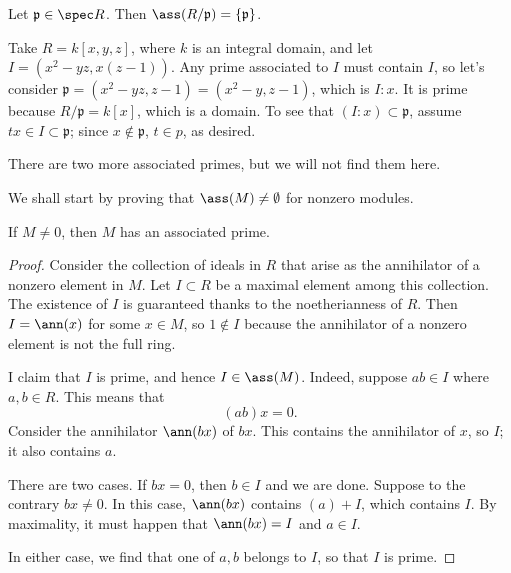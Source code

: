 \begin{exercise} 
Let $\mathfrak{p} \in \spec R$. Then $\ass(R/\mathfrak{p}) =
\left\{\mathfrak{p}\right\}$.
\end{exercise} 

\begin{example}
Take $R=k[x,y,z]$, where $k$ is an integral domain, and let $I = (x^2-yz,x(z-1))$. Any
 prime associated to $I$ must contain $I$, so let's consider
   $\mathfrak{p}=(x^2-yz,z-1)=(x^2-y,z-1)$, which is $I:x$. It is prime because $R/\mathfrak{p} = k[x]$,
   which is a domain. To see that $(I:x)\subset \mathfrak{p}$, assume $tx\in I\subset \mathfrak{p}$; since
   $x\not\in \mathfrak{p}$, $t\in p$, as desired.

   There are two more associated primes, but we will not find them here.
 \end{example}


We shall start by proving that $\ass(M) \neq \emptyset$ for nonzero modules. 
\begin{proposition} \label{assmnonempty} 
If $M \neq 0$, then $M$ has an associated prime.
\end{proposition} 
\begin{proof}  Consider the collection of ideals in $R$ that arise as the
annihilator of a nonzero element in $M$. 
Let $I \subset R$ be a maximal element among this collection.  The existence of $I$ is guaranteed thanks to the noetherianness of
$R$.
Then $I = \ann(x)$ for some $x \in M$, so  $1 \notin I$ because the annihilator of a nonzero element is not the full
ring.

I claim that
$I$ is prime,  and hence $I \in \ass(M)$.  
Indeed, suppose $ab \in I$ where $a,b \in R$. This means that
\[ (ab)x = 0.  \]
Consider the annihilator $\ann(bx)$ of $bx$. This contains the annihilator of $x$, so $I$;
it also contains $a$.

There are two cases. If $bx = 0$, then $ b \in I$ and we are done. Suppose to
the contrary $bx \neq 0$. In this case, $\ann(bx)$ contains $(a) + I$, which
 contains $I$. By maximality, it must happen that $\ann(bx) = I$ and $ a \in
 I$. 

 In either case, we find that one of $a,b $ belongs to $I$, so that $I$ is
 prime. 

\end{proof} 

